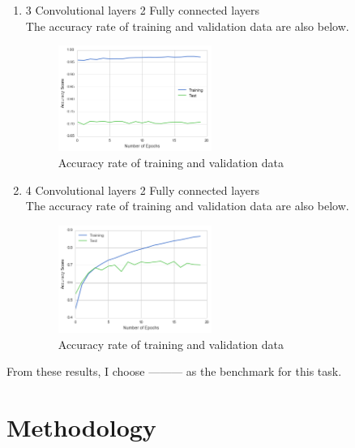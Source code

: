\documentclass[a4paper,10pt,fleqn]{article}
\begin{document}
\begin{enumerate}
\begin{figure}[htbp]
\end{figure}


 \item 3 Convolutional layers 2 Fully connected layers \\
 The accuracy rate of training and validation data are also below.
 
 \begin{figure}[htbp]

	\begin{center}
	\includegraphics[width=5cm]{picture/3layer_cnn.png}
	\caption{Accuracy rate of training and validation data}
	\end{center}
	\label{fig:ten}

\end{figure}
 \item 4 Convolutional layers 2 Fully connected layers \\
 The accuracy rate of training and validation data are also below.
 
 \begin{figure}[htbp]

	\begin{center}
	\includegraphics[width=5cm]{picture/4layer_cnn.png}
	\caption{Accuracy rate of training and validation data}
	\end{center}
	\label{fig:eleven}

\end{figure}
\end{enumerate}


From these results, I choose --------- as the benchmark for this task.

\section{Methodology}
\end{document}
